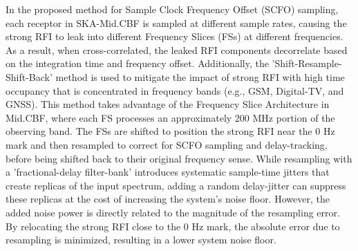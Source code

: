 In the proposed method for Sample Clock Frequency Offset (SCFO) sampling, each receptor in SKA-Mid.CBF is sampled at different sample rates, causing the strong RFI to leak into different Frequency Slices (FSs) at different frequencies. As a result, when cross-correlated, the leaked RFI components decorrelate based on the integration time and frequency offset. Additionally, the 'Shift-Resample-Shift-Back' method is used to mitigate the impact of strong RFI with high time occupancy that is concentrated in frequency bands (e.g., GSM, Digital-TV, and GNSS). This method takes advantage of the Frequency Slice Architecture in Mid.CBF, where each FS processes an approximately 200 MHz portion of the observing band. The FSs are shifted to position the strong RFI near the 0 Hz mark and then resampled to correct for SCFO sampling and delay-tracking, before being shifted back to their original frequency sense. While resampling with a 'fractional-delay filter-bank' introduces systematic sample-time jitters that create replicas of the input spectrum, adding a random delay-jitter can suppress these replicas at the cost of increasing the system's noise floor. However, the added noise power is directly related to the magnitude of the resampling error. By relocating the strong RFI close to the 0 Hz mark, the absolute error due to resampling is minimized, resulting in a lower system noise floor.